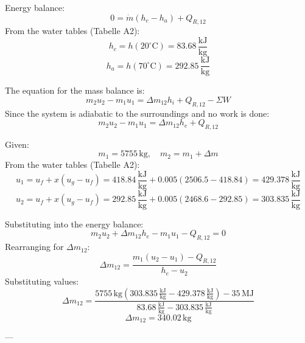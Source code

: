 Energy balance:  
\[
0 = \dot{m}(h_c - h_a) + Q_{R,12}
\]  
From the water tables (Tabelle A2):  
\[
h_c = h(20^\circ\text{C}) = 83.68 \, \frac{\text{kJ}}{\text{kg}}
\]  
\[
h_a = h(70^\circ\text{C}) = 292.85 \, \frac{\text{kJ}}{\text{kg}}
\]  

The equation for the mass balance is:  
\[
m_2 u_2 - m_1 u_1 = \Delta m_{12} h_i + Q_{R,12} - \Sigma W
\]  
Since the system is adiabatic to the surroundings and no work is done:  
\[
m_2 u_2 - m_1 u_1 = \Delta m_{12} h_e + Q_{R,12}
\]  

Given:  
\[
m_1 = 5755 \, \text{kg}, \quad m_2 = m_1 + \Delta m
\]  
From the water tables (Tabelle A2):  
\[
u_1 = u_f + x(u_g - u_f) = 418.84 \, \frac{\text{kJ}}{\text{kg}} + 0.005(2506.5 - 418.84) = 429.378 \, \frac{\text{kJ}}{\text{kg}}
\]  
\[
u_2 = u_f + x(u_g - u_f) = 292.85 \, \frac{\text{kJ}}{\text{kg}} + 0.005(2468.6 - 292.85) = 303.835 \, \frac{\text{kJ}}{\text{kg}}
\]  

Substituting into the energy balance:  
\[
m_2 u_2 + \Delta m_{12} h_e - m_1 u_1 - Q_{R,12} = 0
\]  
Rearranging for \( \Delta m_{12} \):  
\[
\Delta m_{12} = \frac{m_1 (u_2 - u_1) - Q_{R,12}}{h_e - u_2}
\]  
Substituting values:  
\[
\Delta m_{12} = \frac{5755 \, \text{kg} (303.835 \, \frac{\text{kJ}}{\text{kg}} - 429.378 \, \frac{\text{kJ}}{\text{kg}}) - 35 \, \text{MJ}}{83.68 \, \frac{\text{kJ}}{\text{kg}} - 303.835 \, \frac{\text{kJ}}{\text{kg}}}
\]  
\[
\Delta m_{12} = 340.02 \, \text{kg}
\]  

---